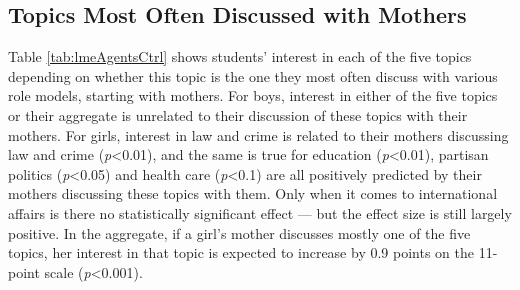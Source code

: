 \documentclass[
  letterpaper,
  DIV=11,
  numbers=noendperiod]{scrreprt}
\begin{document}
\hypertarget{topics-most-often-discussed-with-mothers}{%
\subsection{Topics Most Often Discussed with
Mothers}\label{topics-most-often-discussed-with-mothers}}

Table \ref{tab:lmeAgentsCtrl} shows students' interest in each of the
five topics depending on whether this topic is the one they most often
discuss with various role models, starting with mothers. For boys,
interest in either of the five topics or their aggregate is unrelated to
their discussion of these topics with their mothers. For girls, interest
in law and crime is related to their mothers discussing law and crime
(\emph{p}\textless0.01), and the same is true for education
(\emph{p}\textless0.01), partisan politics (\emph{p}\textless0.05) and
health care (\emph{p}\textless0.1) are all positively predicted by their
mothers discussing these topics with them. Only when it comes to
international affairs is there no statistically significant effect ---
but the effect size is still largely positive. In the aggregate, if a
girl's mother discusses mostly one of the five topics, her interest in
that topic is expected to increase by 0.9 points on the 11-point scale
(\emph{p}\textless0.001).
\end{document}
